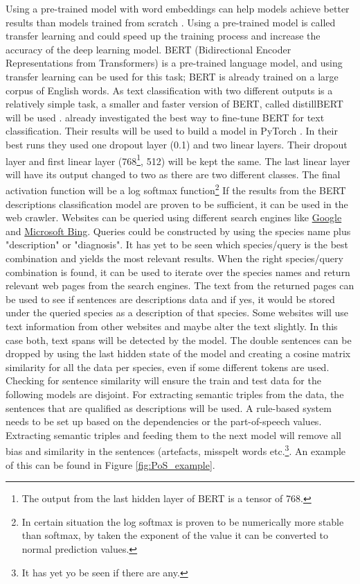 \documentclass{article}
\begin{document}
Using a pre-trained model with word embeddings can help models achieve better results than models trained from scratch \autocite{mikolov_distributed_2013}.
Using a pre-trained model is called transfer learning and could speed up the training process and increase the accuracy of the deep learning model.
BERT (Bidirectional Encoder Representations from Transformers) \autocite{devlin_bert_2019} is a pre-trained language model, and using transfer learning can be used for this task; BERT is already trained on a large corpus of English words.
As text classification with two different outputs is a relatively simple task, a smaller and faster version of BERT, called distillBERT will be used \autocite{sanh_distilbert_2020}.
\textcite{sun_how_2020} already investigated the best way to fine-tune BERT for text classification. 
Their results will be used to build a model in PyTorch \autocite{paszke_pytorch_2019}.
In their best runs they used one dropout layer (0.1) and two linear layers. 
Their dropout layer and first linear layer (768\footnote{The output from the last hidden layer of BERT is a tensor of 768.}, 512) will be kept the same.
The last linear layer will have its output changed to two as there are two different classes.
The final activation function will be a log softmax function\footnote{In certain situation the log softmax is proven to be numerically more stable than softmax, by taken the exponent of the value it can be converted to normal prediction values.}
If the results from the BERT descriptions classification model are proven to be sufficient, it can be used in the web crawler.
Websites can be queried using different search engines like \href{www.google.com}{Google} and \href{www.bing.com}{Microsoft Bing}.
Queries could be constructed by using the species name plus "description" or "diagnosis". 
It has yet to be seen which species/query is the best combination and yields the most relevant results.
When the right species/query combination is found, it can be used to iterate over the species names and return relevant web pages from the search engines.
The text from the returned pages can be used to see if sentences are descriptions data and if yes, it would be stored under the queried species as a description of that species.
Some websites will use text information from other websites and maybe alter the text slightly. In this case both, text spans will be detected by the model. 
The double sentences can be dropped by using the last hidden state of the model and creating a cosine matrix similarity for all the data per species, even if some different tokens are used.
Checking for sentence similarity will ensure the train and test data for the following models are disjoint.
For extracting semantic triples from the data, the sentences that are qualified as descriptions will be used.
A rule-based system needs to be set up based on the dependencies or the part-of-speech values. Extracting semantic triples and feeding them to the next model will remove all bias and similarity in the sentences (artefacts, misspelt words etc.\footnote{It has yet yo be seen if there are any.}.
An example of this can be found in Figure \ref{fig:PoS_example}.
\end{document}
